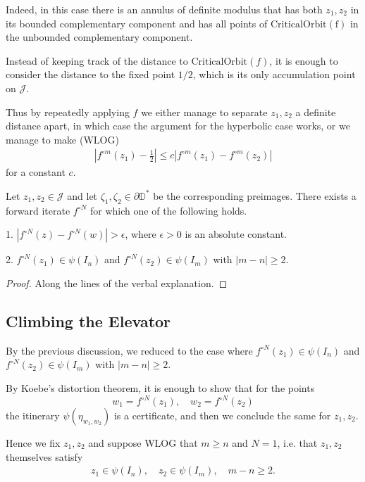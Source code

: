 Indeed, in this case there is an annulus of definite modulus that has both $z_1,z_2$ in its bounded complementary component and has all points of $\mathrm{CriticalOrbit(f)}$ in the unbounded complementary component.

Instead of keeping track of the distance to $\mathrm{CriticalOrbit}(f)$, it is enough to consider the distance to the fixed point $1/2$, which is its only accumulation point on $\mathcal J$.

Thus by repeatedly applying $f$ we either manage to separate $z_1,z_2$ a definite distance apart, in which case the argument for the hyperbolic case works, or we manage to make (WLOG) 
\begin{align*}
|f^{\circ m} (z_1)-\frac 12| \leq c |f^{\circ m} (z_1)-f^{\circ m} (z_2)|
\end{align*}
for a constant $c$.

\begin{theorem}
	Let $z_1,z_2 \in \mathcal J$ and let $\zeta_1,\zeta_2\in \partial \mathbb D^*$ be the corresponding preimages. 
	 There exists a forward iterate	$f^{\circ N}$ for which one of the following holds.
	
	1. $\left|f^{\circ N}(z)-f^{\circ N}(w)\right|>\epsilon$, where $\epsilon>0$ is an absolute constant.
	
	2. $f^{\circ N }(z_1) \in \psi(I_n)$ and $f^{\circ N }(z_2) \in \psi(I_m)$ with $|m-n| \geq 2$.
\end{theorem}

\begin{proof}
	Along the lines of the verbal explanation.
\end{proof}

\subsection{Climbing the Elevator}
By the previous discussion, we reduced to the case where $f^{\circ N }(z_1) \in \psi(I_n)$ and $f^{\circ N}(z_2) \in \psi(I_m)$ with $|m-n| \geq 2$.

By Koebe's distortion theorem, it is enough to show that for the points $$w_1=f^{\circ N }(z_1),\quad w_2=f^{\circ N }(z_2)$$ the itinerary $\psi(\eta_{w_1,w_2})$ is a certificate, and then we conclude the same for $z_1,z_2$. 

Hence we fix $z_1,z_2$ and suppose WLOG that $m\geq n$ and $N=1$, i.e. that $z_1,z_2$ themselves satisfy 
\begin{align} \label{parabolic separation}
	z_1 \in \psi(I_n), \quad z_2 \in \psi(I_m), \quad m-n \geq 2.
\end{align}

